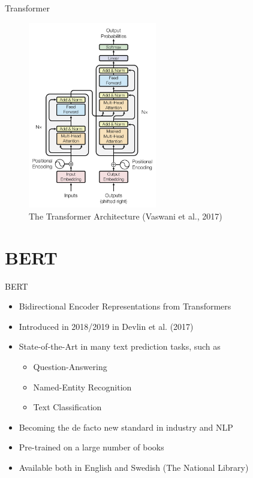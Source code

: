 \documentclass[10pt]{beamer}
\begin{document}
\begin{frame}{Transformer}

\begin{figure}[h]
\centering
\includegraphics[width=0.5\textwidth]{fig/Vaswani_1_transformer.png}
\caption{The Transformer Architecture (Vaswani et al., 2017)}
\end{figure}

\end{frame}



\section{BERT}


\begin{frame}{BERT}

\begin{itemize}
\item Bidirectional Encoder Representations from Transformers
\item Introduced in 2018/2019 in Devlin et al. (2017)
\pause
\item {\color{uured} State-of-the-Art} in many text prediction tasks, such as
\begin{itemize}
\item Question-Answering
\item Named-Entity Recognition
\item Text Classification
\end{itemize}
\pause
\item Becoming the de facto new standard in industry and NLP
\pause
\item {\color{uured} Pre-trained} on a large number of books
\pause
\item Available both in English and Swedish (The National Library)
\end{itemize}

\end{frame}
\end{document}
